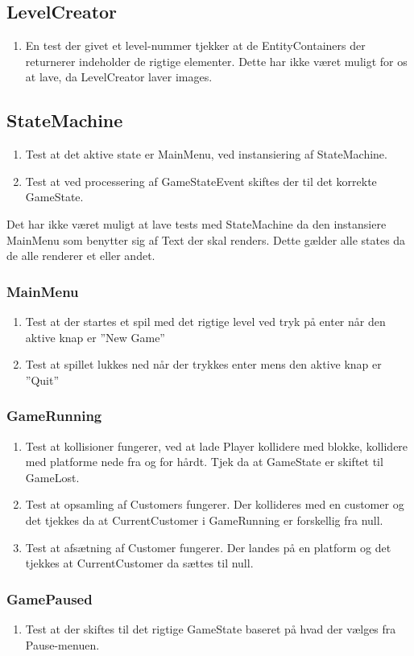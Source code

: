    \subsection{LevelCreator}
      \begin{enumerate}
         \item En test der givet et level-nummer tjekker at de EntityContainers der returnerer indeholder de rigtige elementer. Dette har ikke været muligt for os at lave, da LevelCreator laver images.
      \end{enumerate}
   \subsection{StateMachine}
      \begin{enumerate}
         \item Test at det aktive state er MainMenu, ved instansiering af StateMachine.
         \item Test at ved processering af GameStateEvent skiftes der til det korrekte GameState.
      \end{enumerate}
      Det har ikke været muligt at lave tests med StateMachine da den instansiere MainMenu som benytter sig af Text der skal renders. Dette gælder alle states da de alle renderer et eller andet.
   \subsubsection{MainMenu}
      \begin{enumerate}
         \item Test at der startes et spil med det rigtige level ved tryk på enter når den aktive knap er ''New Game''
         \item Test at spillet lukkes ned når der trykkes enter mens den aktive knap er ''Quit''
      \end{enumerate}
   \subsubsection{GameRunning}
      \begin{enumerate}
         \item Test at kollisioner fungerer, ved at lade Player kollidere med blokke, kollidere med platforme nede fra og for hårdt. Tjek da at GameState er skiftet til GameLost. 
         \item Test at opsamling af Customers fungerer. Der kollideres med en customer og det tjekkes da at CurrentCustomer i GameRunning er forskellig fra null.
         \item Test at afsætning af Customer fungerer. Der landes på en platform og det tjekkes at CurrentCustomer da sættes til null.
      \end{enumerate}
   \subsubsection{GamePaused}
      \begin{enumerate}
         \item Test at der skiftes til det rigtige GameState baseret på hvad der vælges fra Pause-menuen.
      \end{enumerate}

      